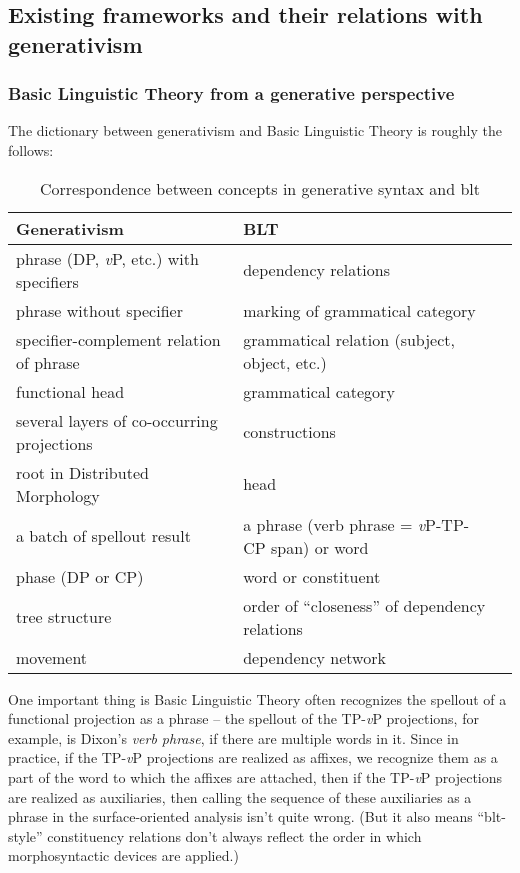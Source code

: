 \documentclass[UTF8, a4paper, oneside, scheme=plain]{ctexrep}
\newcommand*{\term}[1]{\emph{#1}}
\newcommand{\vP}{\textit{v}P}
\begin{document}
\subsection{Existing frameworks and their relations with generativism}

\subsubsection{Basic Linguistic Theory from a generative perspective}\label{sec:blt-generative}

The dictionary between generativism and Basic Linguistic Theory is roughly the follows:
\begin{table}[H]
    \caption{Correspondence between concepts in generative syntax and \acs{blt}}
    \centering
    \begin{tabular}{@{}lll@{}}
    \toprule
    Generativism                               & BLT                                          \\ \midrule
    phrase (DP, \vP, etc.) with specifiers     & dependency relations                          \\
    phrase without specifier                   & marking of grammatical category               \\
    specifier-complement relation of phrase    & grammatical relation (subject, object, etc.)  \\
    functional head                            & grammatical category                          \\
    several layers of co-occurring projections & constructions                                 \\
    root in Distributed Morphology             & head                                          \\
    a batch of spellout result                 & a phrase (verb phrase = \vP-TP-CP span) or word    \\
    phase (DP or CP)                           & word or constituent                           \\
    tree structure                             & order of ``closeness'' of dependency relations  \\
    movement                                   & dependency network                            \\ \bottomrule
    \end{tabular}
\end{table}

One important thing is Basic Linguistic Theory often recognizes 
the spellout of a functional projection 
as a phrase -- 
the spellout of the TP-\vP{} projections, 
for example, is Dixon's \term{verb phrase}, 
if there are multiple words in it.
Since in practice, if the TP-\vP{} projections are realized as affixes, 
we recognize them as a part of the word to which the affixes are attached,
then if the TP-\vP{} projections are realized as auxiliaries,
then calling the sequence of these auxiliaries as a phrase in the surface-oriented analysis 
isn't quite wrong.
(But it also means ``\acs{blt}-style'' constituency relations 
don't always reflect the order in which morphosyntactic devices are applied.)
\end{document}
